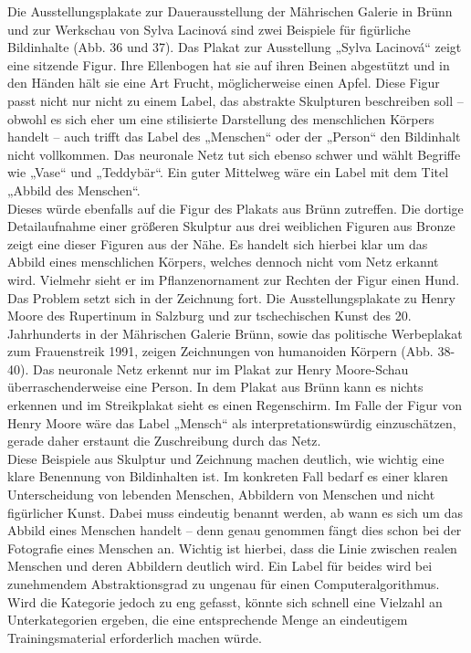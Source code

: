 \documentclass[a4paper,12pt,ngerman]{article}
\begin{document}
Die Ausstellungsplakate zur Dauerausstellung der Mährischen Galerie in Brünn und zur Werkschau von Sylva Lacinová sind zwei Beispiele für figürliche Bildinhalte (Abb. 36 und 37). Das Plakat zur Ausstellung „Sylva Lacinová“ zeigt eine sitzende Figur. Ihre Ellenbogen hat sie auf ihren Beinen abgestützt und in den Händen hält sie eine Art Frucht, möglicherweise einen Apfel. Diese Figur passt nicht nur nicht zu einem Label, das abstrakte Skulpturen beschreiben soll -- obwohl es sich eher um eine stilisierte Darstellung des menschlichen Körpers handelt -- auch trifft das Label des „Menschen“ oder der „Person“ den Bildinhalt nicht vollkommen. Das neuronale Netz tut sich ebenso schwer und wählt Begriffe wie „Vase“ und „Teddybär“. Ein guter Mittelweg wäre ein Label mit dem Titel „Abbild des Menschen“.\\
Dieses würde ebenfalls auf die Figur des Plakats aus Brünn zutreffen. Die dortige Detailaufnahme einer größeren Skulptur aus drei weiblichen Figuren aus Bronze zeigt eine dieser Figuren aus der Nähe. Es handelt sich hierbei klar um das Abbild eines menschlichen Körpers, welches dennoch nicht vom Netz erkannt wird. Vielmehr sieht er im Pflanzenornament zur Rechten der Figur einen Hund. \\
Das Problem setzt sich in der Zeichnung fort. Die Ausstellungsplakate zu Henry Moore des Rupertinum in Salzburg und zur tschechischen Kunst des 20. Jahrhunderts in der Mährischen Galerie Brünn, sowie das politische Werbeplakat zum Frauenstreik 1991, zeigen Zeichnungen von humanoiden Körpern (Abb. 38-40). Das neuronale Netz erkennt nur im Plakat zur Henry Moore-Schau überraschenderweise eine Person. In dem Plakat aus Brünn kann es nichts erkennen und im Streikplakat sieht es einen Regenschirm. Im Falle der Figur von Henry Moore wäre das Label „Mensch“ als interpretationswürdig einzuschätzen, gerade daher erstaunt die Zuschreibung durch das Netz. \\
Diese Beispiele aus Skulptur und Zeichnung machen deutlich, wie wichtig eine klare Benennung von Bildinhalten ist. Im konkreten Fall bedarf es einer klaren Unterscheidung von lebenden Menschen, Abbildern von Menschen und nicht figürlicher Kunst. Dabei muss eindeutig benannt werden, ab wann es sich um das Abbild eines Menschen handelt -- denn genau genommen fängt dies schon bei der Fotografie eines Menschen an. Wichtig ist hierbei, dass die Linie zwischen realen Menschen und deren Abbildern deutlich wird. Ein Label für beides wird bei zunehmendem Abstraktionsgrad zu ungenau für einen Computeralgorithmus. Wird die Kategorie jedoch zu eng gefasst, könnte sich schnell eine Vielzahl an Unterkategorien ergeben, die eine entsprechende Menge an eindeutigem Trainingsmaterial erforderlich machen würde. \\
\end{document}
